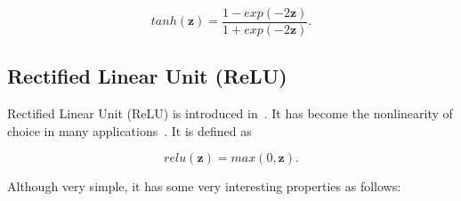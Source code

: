 \begin{equation}\label{eq:tanh}
    tanh(\mathbf{z}) = \frac{1-exp(-2\mathbf{z})}{1+exp(-2\mathbf{z})}.
\end{equation}


\subsection{Rectified Linear Unit (ReLU)}\label{sec:relu}
Rectified Linear Unit (ReLU) is introduced in~\cite{krizhevsky2012imagenet}. It has become the nonlinearity of choice in many applications~\cite{he2016deep}\cite{krizhevsky2012imagenet}. It is defined as \cite{krizhevsky2012imagenet}

\begin{equation}\label{eq:relu}
    relu(\mathbf{z}) = max(0, \mathbf{z}).
\end{equation}

Although very simple, it has some very interesting properties\cite{he2015delving} as follows:

